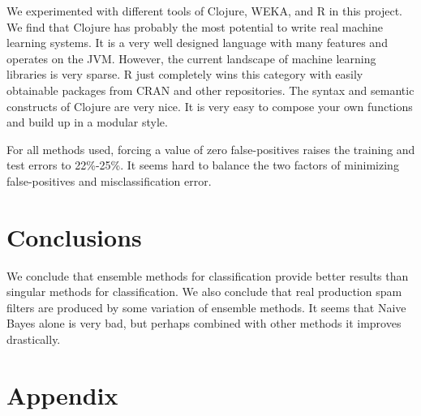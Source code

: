 \documentclass[a4paper,10pt]{article}
\begin{document}
We experimented with different tools of Clojure, WEKA, and R in this project. We find that Clojure has probably the most potential to
write real machine learning systems. It is a very well designed language with many features and operates on the JVM. However, the current
landscape of machine learning libraries is very sparse. R just completely wins this category with easily obtainable packages from CRAN and 
other repositories. The syntax and semantic constructs of Clojure are very nice. It is very easy to compose your own functions and build up
in a modular style.

For all methods used, forcing a value of zero false-positives raises the training and test errors to 22\%-25\%. It seems hard to balance
the two factors of minimizing false-positives and misclassification error.

\section{Conclusions}

We conclude that ensemble methods for classification provide better results than singular methods for classification. We also conclude
that real production spam filters are produced by some variation of ensemble methods. It seems that Naive Bayes alone is very bad, but perhaps
combined with other methods it improves drastically. 



\nocite{Lotte_topicalreview, kearns, spam!, lisp, fletcher, hastie01statisticallearning, bayes}



\section{Appendix}
\end{document}
